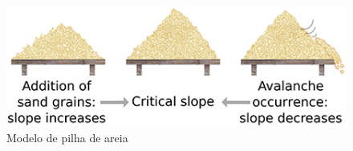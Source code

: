 \begin{figure}[]
	\centering
	\caption{Modelo de pilha de areia}
	\label{fig:sandpile}
	\includegraphics[width=0.7\linewidth]{figs/sandpile}
\end{figure}



